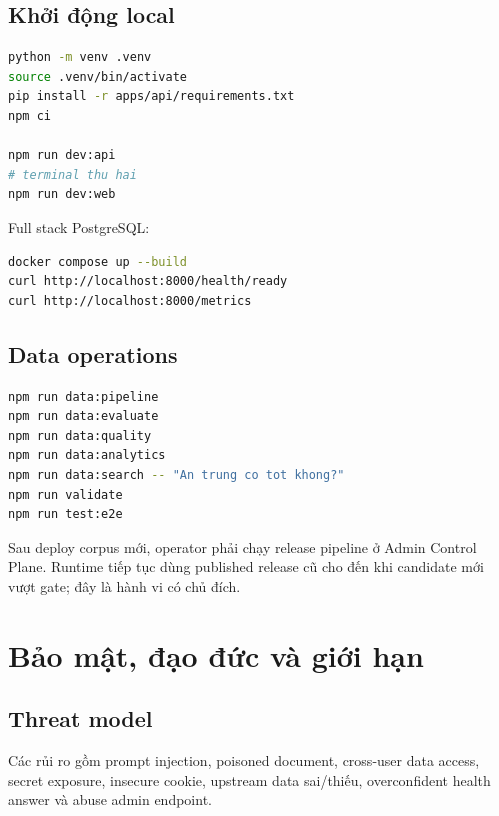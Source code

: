 \documentclass[12pt,a4paper]{report}
\begin{document}
\section{Khởi động local}

\begin{lstlisting}[language=bash]
python -m venv .venv
source .venv/bin/activate
pip install -r apps/api/requirements.txt
npm ci

npm run dev:api
# terminal thu hai
npm run dev:web
\end{lstlisting}

Full stack PostgreSQL:

\begin{lstlisting}[language=bash]
docker compose up --build
curl http://localhost:8000/health/ready
curl http://localhost:8000/metrics
\end{lstlisting}

\section{Data operations}

\begin{lstlisting}[language=bash]
npm run data:pipeline
npm run data:evaluate
npm run data:quality
npm run data:analytics
npm run data:search -- "An trung co tot khong?"
npm run validate
npm run test:e2e
\end{lstlisting}

Sau deploy corpus mới, operator phải chạy release pipeline ở Admin Control
Plane. Runtime tiếp tục dùng published release cũ cho đến khi candidate mới
vượt gate; đây là hành vi có chủ đích.

\chapter{Bảo mật, đạo đức và giới hạn}

\section{Threat model}

Các rủi ro gồm prompt injection, poisoned document, cross-user data access,
secret exposure, insecure cookie, upstream data sai/thiếu, overconfident health
answer và abuse admin endpoint.
\end{document}
